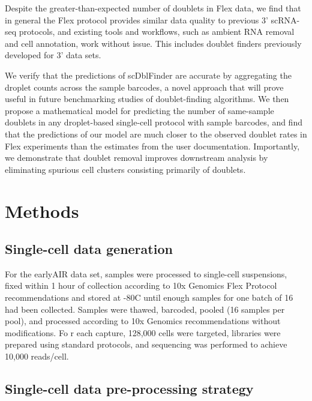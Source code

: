 \documentclass[unnumsec,webpdf,modern,large]{oup-authoring-template}
\begin{document}
	Despite the greater-than-expected number of doublets in Flex data, we find that in general the Flex protocol provides similar data quality to previous 3’ scRNA-seq protocols, and existing tools and workflows, such as ambient RNA removal and cell annotation, work without issue. 
	This includes doublet finders previously developed for 3' data sets.
		
	We verify that the predictions of scDblFinder are accurate by aggregating the droplet counts across the sample barcodes, a novel approach that will prove useful in future benchmarking studies of doublet-finding algorithms. 
	We then propose a mathematical model for predicting the number of same-sample doublets in any droplet-based single-cell protocol with sample barcodes, and find that the predictions of our model are much closer to the observed doublet rates in Flex experiments than the estimates from the user documentation. 
	Importantly, we demonstrate that doublet removal improves downstream analysis by eliminating spurious cell clusters consisting primarily of doublets.
	
	
	\section{Methods}
	\label{sec:methods}
	
	\subsection{Single-cell data generation}
	\label{subsec:data_generation}
	
	For the earlyAIR data set, samples were processed to single-cell suspensions, fixed within 1 hour of collection according to 10x Genomics Flex Protocol recommendations 
	\citep{10X_flex_protocol}
	and stored at -80C until enough samples for one batch of 16 had been collected. 
	Samples were thawed, barcoded, pooled (16 samples per pool), and processed according to 10x Genomics recommendations without modifications. Fo
	r each capture, 128,000 cells were targeted, libraries were prepared using standard protocols, and sequencing was performed to achieve 10,000 reads/cell.	
	
	\subsection{Single-cell data pre-processing strategy}
	\label{subsec:preprocessing}
	
\end{document}
